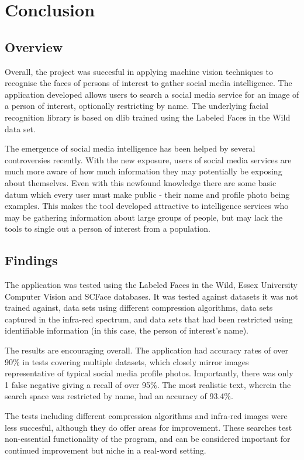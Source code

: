 \documentclass[12pt]{article}
\begin{document}
\newpage
\section{Conclusion}
\subsection{Overview}
Overall, the project was succesful in applying machine vision techniques to recognise the faces of persons of interest to gather social media intelligence. The application developed allows users to search a social media service for an image of a person of interest, optionally restricting by name. The underlying facial recognition library is based on dlib trained using the Labeled Faces in the Wild data set.

The emergence of social media intelligence has been helped by several controversies recently. With the new exposure, users of social media services are much more aware of how much information they may potentially be exposing about themselves. Even with this newfound knowledge there are some basic datum which every user must make public - their name and profile photo being examples. This makes the tool developed attractive to intelligence services who may be gathering information about large groups of people, but may lack the tools to single out a person of interest from a population.

\subsection{Findings}
The application was tested using the Labeled Faces in the Wild, Essex University Computer Vision and SCFace databases. It was tested against datasets it was not trained against, data sets using different compression algorithms, data sets captured in the infra-red spectrum, and data sets that had been restricted using identifiable information (in this case, the person of interest's name). 

The results are encouraging overall. The application had accuracy rates of over 90\% in tests covering multiple datasets, which closely mirror images representative of typical social media profile photos. Importantly, there was only 1 false negative giving a recall of over 95\%. The most realistic text, wherein the search space was restricted by name, had an accuracy of 93.4\%.

The tests including different compression algorithms and infra-red images were less succesful, although they do offer areas for improvement. These searches test non-essential functionality of the program, and can be considered important for continued improvement but niche in a real-word setting.
\end{document}
